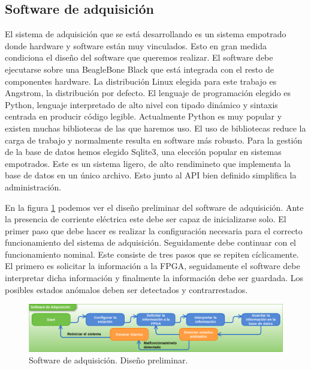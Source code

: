 	\subsection{Software de adquisición}
		El sistema de adquisición que se está desarrollando es un sistema empotrado donde hardware y software están muy vinculados. Esto en
		gran medida condiciona el diseño del software que queremos realizar. El software debe ejecutarse sobre una BeagleBone
		Black\cite{Beagle} que está integrada con el resto de componentes hardware. La distribución Linux elegida para este trabajo es
		Angstrom, la distribución por defecto. El lenguaje de programación elegido es Python\cite{Python}, lenguaje interpretado de alto nivel
		con tipado dinámico y sintaxis centrada en producir código legible.  Actualmente Python es muy popular y existen muchas bibliotecas de
		las que haremos uso. El uso de bibliotecas reduce la carga de trabajo y normalmente resulta en software más robusto. Para la gestión
		de la base de datos hemos elegido Sqlite3\cite{Sqlite}, una elección popular en sistemas empotrados. Este es un sistema ligero, de
		alto rendimineto que implementa la base de datos en un único archivo. Esto junto al API bien definido simplifica la administración.
		\par
		En la figura \ref{fig:soft_control_preliminar} podemos ver el diseño preliminar del software de adquisición. Ante la presencia de
		corriente eléctrica este debe ser capaz de inicializarse solo. El primer paso que debe hacer es realizar la configuración necesaria
		para el correcto funcionamiento del sistema de adquisición. Seguidamente debe continuar con el funcionamiento nominal. Este consiste
		de tres pasos que se repiten cíclicamente. El primero es solicitar la información a la FPGA, seguidamente el software debe interpretar
		dicha información y finalmente la información debe ser guardada. Los posibles estados anómalos deben ser detectados y contrarrestados. 
		\begin{figure}[h]
			\centering
			\includegraphics[keepaspectratio, width=1\textwidth]{./img/soft_control_preliminar.png}
			\caption{Software de adquisición. Diseño preliminar.}
			\label{fig:soft_control_preliminar}
		\end{figure}
